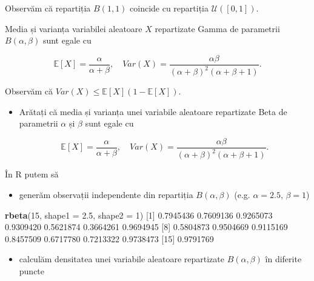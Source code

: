 \documentclass[]{article}
\newenvironment{Shaded}{\begin{snugshade}}{\end{snugshade}}
\newcommand{\KeywordTok}[1]{\textcolor[rgb]{0.13,0.29,0.53}{\textbf{#1}}}
\newcommand{\DataTypeTok}[1]{\textcolor[rgb]{0.13,0.29,0.53}{#1}}
\newcommand{\DecValTok}[1]{\textcolor[rgb]{0.00,0.00,0.81}{#1}}
\newcommand{\FloatTok}[1]{\textcolor[rgb]{0.00,0.00,0.81}{#1}}
\newcommand{\NormalTok}[1]{#1}
\providecommand{\tightlist}{%
  \setlength{\itemsep}{0pt}\setlength{\parskip}{0pt}}
\newenvironment{frshaded*}{%
  \def\FrameCommand{\fboxrule=\FrameRule\fboxsep=\FrameSep \fcolorbox{framecolor}{shadecolor1}}%
  \MakeFramed {\advance\hsize-\width \FrameRestore}}%
{\endMakeFramed}
\newenvironment{rmdblock}[1]
  {\begin{frshaded*}
  \begin{itemize}
  \renewcommand{\labelitemi}{
    \raisebox{-.7\height}[0pt][0pt]{
      {\setkeys{Gin}{width=2em,keepaspectratio}\texttt{[image: images/icons/\#1]}}
    }
  }
  \item
  }
  {
  \end{itemize}
  \end{frshaded*}
  }
\newenvironment{rmdexercise}
  {\begin{rmdblock}{exercise}}
  {\end{rmdblock}}
\begin{document}
Observăm că repartiția \(B(1, 1)\) coincide cu repartiția
\(\mathcal{U}([0,1])\).

Media și varianța variabilei aleatoare \(X\) repartizate Gamma de
parametrii \(B(\alpha, \beta)\) sunt egale cu

\[
  \mathbb{E}[X] = \frac{\alpha}{\alpha+\beta},\quad Var(X) = \frac{\alpha\beta}{(\alpha+\beta)^2(\alpha+\beta+1)}.
\]

Observăm că \(Var(X)\leq\mathbb{E}[X](1-\mathbb{E}[X])\).

\begin{rmdexercise}
Arătați că media și varianța unei variabile aleatoare repartizate Beta
de parametrii \(\alpha\) și \(\beta\) sunt egale cu

\[
  \mathbb{E}[X] = \frac{\alpha}{\alpha+\beta},\quad Var(X) = \frac{\alpha\beta}{(\alpha+\beta)^2(\alpha+\beta+1)}. 
\]
\end{rmdexercise}

În R putem să

\begin{itemize}
\tightlist
\item
  generăm observații independente din repartiția \(B(\alpha, \beta)\)
  (e.g. \(\alpha = 2.5\), \(\beta = 1\))
\end{itemize}

\begin{Shaded}
\begin{Highlighting}[]
\KeywordTok{rbeta}\NormalTok{(}\DecValTok{15}\NormalTok{, }\DataTypeTok{shape1 =} \FloatTok{2.5}\NormalTok{, }\DataTypeTok{shape2 =} \DecValTok{1}\NormalTok{)}
\NormalTok{ [}\DecValTok{1}\NormalTok{] }\FloatTok{0.7945436} \FloatTok{0.7609136} \FloatTok{0.9265073} \FloatTok{0.9309420} \FloatTok{0.5621874} \FloatTok{0.3664261} \FloatTok{0.9694945}
\NormalTok{ [}\DecValTok{8}\NormalTok{] }\FloatTok{0.5804873} \FloatTok{0.9504669} \FloatTok{0.9115169} \FloatTok{0.8457509} \FloatTok{0.6717780} \FloatTok{0.7213322} \FloatTok{0.9738473}
\NormalTok{[}\DecValTok{15}\NormalTok{] }\FloatTok{0.9791769}
\end{Highlighting}
\end{Shaded}

\begin{itemize}
\tightlist
\item
  calculăm densitatea unei variabile aleatoare repartizate
  \(B(\alpha, \beta)\) în diferite puncte
\end{itemize}
\end{document}
